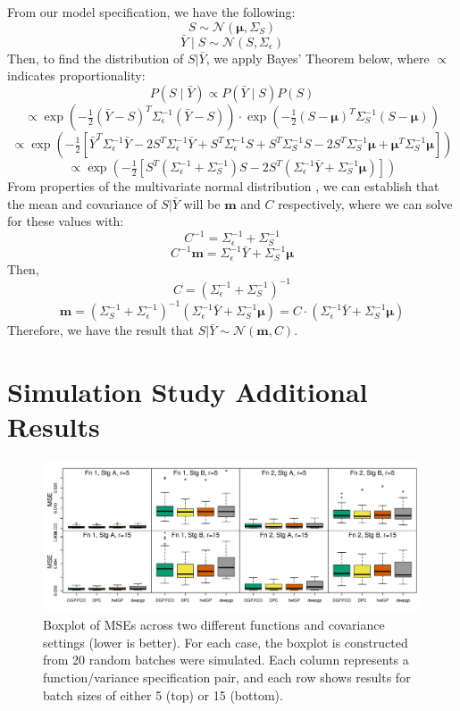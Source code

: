 \documentclass[11pt]{article}
\begin{document}
From our model specification, we have the following:
\[
S \sim \mathcal{N}(\boldsymbol{\mu}, \Sigma_S)
\]
\[
\bar{Y} \mid S \sim \mathcal{N}(S, \Sigma_\epsilon)
\]
Then, to find the distribution of $S|\bar{Y}$, we apply Bayes' Theorem below, 
where $\propto$ indicates proportionality:
\[
P(S \mid \bar{Y}) \propto P(\bar{Y} \mid S) P(S)
\]
\[
\propto \exp\left(-\tfrac{1}{2} (\bar{Y} - S)^T \Sigma_\epsilon^{-1} (\bar{Y} - S) \right) 
\cdot \exp\left(-\tfrac{1}{2} (S - \boldsymbol{\mu})^T \Sigma_S^{-1} (S - \boldsymbol{\mu})\right)
\]
\[
\propto \exp\left(-\tfrac{1}{2} \left[ \bar{Y}^T \Sigma_\epsilon^{-1} \bar{Y} 
- 2 S^T \Sigma_\epsilon^{-1} \bar{Y} + S^T \Sigma_\epsilon^{-1} S + S^T \Sigma_S^{-1} S 
- 2 S^T \Sigma_S^{-1} \boldsymbol{\mu} + \boldsymbol{\mu}^T \Sigma_S^{-1} \boldsymbol{\mu} \right] \right)
\]
\[
\propto \exp\left( -\tfrac{1}{2} \left[ S^T (\Sigma_\epsilon^{-1} + \Sigma_S^{-1}) S 
- 2 S^T (\Sigma_\epsilon^{-1} \bar{Y} + \Sigma_S^{-1} \boldsymbol{\mu}) \right] \right)
\]
From properties of the multivariate normal distribution \citep[e.g., Equation 7.1 of][]{hoff2009first},
we can establish that the mean and covariance of $S|\bar{Y}$ will be $\boldsymbol{m}$
and $C$ respectively, where we can solve for these values with:
\[
C^{-1} = \Sigma_\epsilon^{-1} + \Sigma_S^{-1}
\]
\[
C^{-1} \boldsymbol{m} = \Sigma_\epsilon^{-1} \bar{Y} + \Sigma_S^{-1} \boldsymbol{\mu}
\]
Then,
\[
C = (\Sigma_\epsilon^{-1} + \Sigma_S^{-1})^{-1}
\]
\[
\boldsymbol{m} = \left( \Sigma_S^{-1} + \Sigma_\epsilon^{-1} \right)^{-1} 
\left( \Sigma_\epsilon^{-1} \bar{Y} + \Sigma_S^{-1} \boldsymbol{\mu} \right)
= C \cdot \left( \Sigma_\epsilon^{-1} \bar{Y} + \Sigma_S^{-1} \boldsymbol{\mu} \right)
\]
Therefore, we have the result that $S|\bar{Y} \sim \mathcal{N}(\boldsymbol{m}, C)$.

\section{Simulation Study Additional Results}
\label{sec:apdx_sims}

\begin{figure}[H]
    \centering
    \includegraphics[width=\textwidth]{sims_MSE.jpeg}
    \caption{Boxplot of MSEs across two different functions and covariance settings 
             (lower is better). For each case, the boxplot is constructed from 20 
             random batches were simulated. Each column represents a function/variance 
             specification pair, and each row shows results for batch sizes of 
             either 5 (top) or 15 (bottom).}    
    \label{fig:sims_MSE}
\end{figure}
\end{document}
